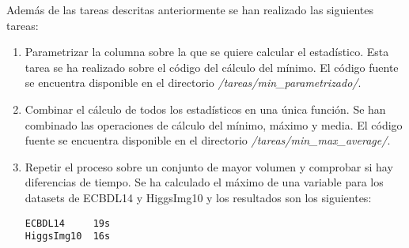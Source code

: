 Además de las tareas descritas anteriormente se han realizado las siguientes tareas:

\begin{enumerate}
	\item Parametrizar la columna sobre la que se quiere calcular el estadístico. Esta tarea se ha realizado sobre el código del cálculo del mínimo. El código fuente se encuentra disponible en el directorio \textit{/tareas/min\_parametrizado/}.
	\item Combinar el cálculo de todos los estadísticos en una única función. Se han combinado las operaciones de cálculo del mínimo, máximo y media. El código fuente se encuentra disponible en el directorio \textit{/tareas/min\_max\_average/}. 
	\item Repetir el proceso sobre un conjunto de mayor volumen y comprobar si hay diferencias de tiempo. Se ha calculado el máximo de una variable para los datasets de ECBDL14 y HiggsImg10 y los resultados son los siguientes:
\begin{lstlisting}
ECBDL14		19s
HiggsImg10  16s
\end{lstlisting}
\end{enumerate}


